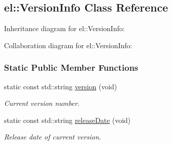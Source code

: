 \hypertarget{a00093}{}\subsection{el\+:\+:Version\+Info Class Reference}
\label{a00093}


Inheritance diagram for el\+:\+:Version\+Info\+:


Collaboration diagram for el\+:\+:Version\+Info\+:
\subsubsection*{Static Public Member Functions}
\begin{DoxyCompactItemize}
\item 
\hypertarget{a00093_a6fee512d52168445b2118ff2b31b4058}{}static const std\+::string \hyperlink{a00093_a6fee512d52168445b2118ff2b31b4058}{version} (void)\label{a00093_a6fee512d52168445b2118ff2b31b4058}

\begin{DoxyCompactList}\small\item\em Current version number. \end{DoxyCompactList}\item 
\hypertarget{a00093_ab23c2545115898f4071fa4e125204946}{}static const std\+::string \hyperlink{a00093_ab23c2545115898f4071fa4e125204946}{release\+Date} (void)\label{a00093_ab23c2545115898f4071fa4e125204946}

\begin{DoxyCompactList}\small\item\em Release date of current version. \end{DoxyCompactList}\end{DoxyCompactItemize}
